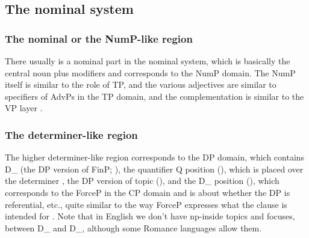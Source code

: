 \documentclass[UTF8, a4paper, oneside, scheme=plain, 12pt]{ctexbook}
\begin{document}
{\subsection{The nominal system}\label{sec:theory.nominal}

\subsubsection{The nominal or the NumP-like region}

There usually is a nominal part in the nominal system,
which is basically the central noun plus modifiers
and corresponds to the NumP domain.
The NumP itself is similar to the role of TP,
and the various adjectives are similar to specifiers of AdvPs in the TP domain,
and the complementation is similar to the VP layer
\citep{laenzlinger2017view}. 

\subsubsection{The determiner-like region}

The higher determiner-like region corresponds to the DP domain,
which contains D_{} (the DP version of FinP; ),
the quantifier Q position (),
which is placed over the determiner \citep{gianollo2021reference},
the DP version of topic (),
and the D_{} position (),
which corresponds to the ForceP in the CP domain
and is about whether the DP is referential, etc.,
quite similar to the way ForceP expresses what the clause is intended for
\citep{laenzlinger2005french}.
Note that in English we don't have \acs{np}-inside topics and focuses,
between D_{} and D_{},
although some Romance languages allow them.

}
\end{document}
